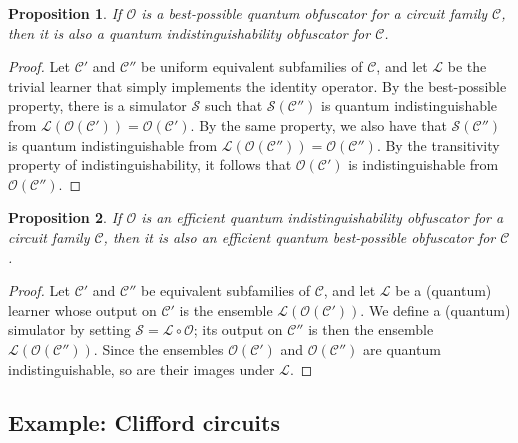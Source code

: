 \documentclass[11pt]{article}
\numberwithin{equation}{section}
\newtheorem{proposition}{Proposition}
\begin{document}
\begin{proposition} If $\mathcal O$ is a best-possible quantum obfuscator for a circuit family $\mathcal C$, then it is also a quantum indistinguishability obfuscator for $\mathcal C$.
\end{proposition}
\begin{proof}
Let $\mathcal C'$ and $\mathcal C''$ be uniform equivalent subfamilies of $\mathcal C$, and let $\mathcal L$ be the trivial learner that simply implements the identity operator. By the best-possible property, there is a simulator $\mathcal S$ such that $\mathcal S(\mathcal C'')$ is quantum indistinguishable from $\mathcal L ( \mathcal O( \mathcal C')) = \mathcal O ( \mathcal C')$. By the same property, we also have that $\mathcal S(\mathcal C'')$ is quantum indistinguishable from $\mathcal L(\mathcal O (\mathcal C'')) = \mathcal O( \mathcal C'')$. By the transitivity property of indistinguishability, it follows that $\mathcal O(\mathcal C')$ is indistinguishable from $\mathcal O(\mathcal C'')$.
\end{proof}

\begin{proposition} If $\mathcal O$ is an efficient quantum indistinguishability obfuscator for a circuit family $\mathcal C$, then it is also an efficient quantum best-possible obfuscator for $\mathcal C$.
\end{proposition}
\begin{proof}
Let $\mathcal C'$ and $\mathcal C''$ be equivalent subfamilies of $\mathcal C$, and let $\mathcal L$ be a (quantum) learner whose output on $\mathcal C'$ is the ensemble $\mathcal L(\mathcal O (\mathcal C'))$. We define a (quantum) simulator by setting $\mathcal S = \mathcal L \circ \mathcal O$; its output on $\mathcal C''$ is then the ensemble $\mathcal L(\mathcal O(\mathcal C''))$. Since the ensembles $\mathcal O(\mathcal C')$ and $\mathcal O(\mathcal C'')$ are quantum indistinguishable, so are their images under $\mathcal L$.
\end{proof}

\subsection{Example: Clifford circuits}
\end{document}
